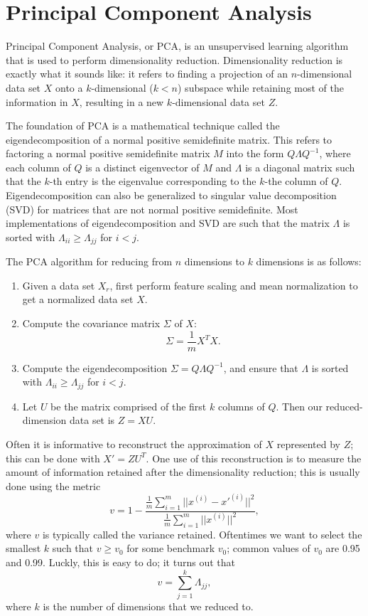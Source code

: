 \documentclass{article}
\begin{document}
\section{Principal Component Analysis}
Principal Component Analysis, or PCA, is an unsupervised learning algorithm that is used to perform dimensionality reduction. Dimensionality reduction is exactly what it sounds like: it refers to finding a projection of an $n$-dimensional data set $X$ onto a $k$-dimensional ($k < n$) subspace while retaining most of the information in $X$, resulting in a new $k$-dimensional data set $Z$.

The foundation of PCA is a mathematical technique called the eigendecomposition of a normal positive semidefinite matrix. This refers to factoring a normal positive semidefinite matrix $M$ into the form $Q\Lambda Q^{-1}$, where each column of $Q$ is a distinct eigenvector of $M$ and $\Lambda$ is a diagonal matrix such that the $k$-th entry is the eigenvalue corresponding to the $k$-the column of $Q$. Eigendecomposition can also be generalized to singular value decomposition (SVD) for matrices that are not normal positive semidefinite. Most implementations of eigendecomposition and SVD are such that the matrix $\Lambda$ is sorted with $\Lambda_{ii} \ge \Lambda_{jj}$ for $i < j$.

The PCA algorithm for reducing from $n$ dimensions to $k$ dimensions is as follows:
\begin{enumerate}
\item Given a data set $X_r$, first perform feature scaling and mean normalization to get a normalized data set $X$.
\item Compute the covariance matrix $\Sigma$ of $X$:
$$\Sigma = \frac{1}{m}X^TX.$$
\item Compute the eigendecomposition $\Sigma = Q\Lambda Q^{-1}$, and ensure that $\Lambda$ is sorted with $\Lambda_{ii} \ge \Lambda_{jj}$ for $i < j$.
\item Let $U$ be the matrix comprised of the first $k$ columns of $Q$. Then our reduced-dimension data set is $Z = XU$.
\end{enumerate}
Often it is informative to reconstruct the approximation of $X$ represented by $Z$; this can be done with $X' = ZU^T$. One use of this reconstruction is to measure the amount of information retained after the dimensionality reduction; this is usually done using the metric
$$v = 1 - \frac{\frac{1}{m} \sum_{i=1}^m ||x^{(i)} - x'^{(i)}||^2}{\frac{1}{m} \sum_{i=1}^m ||x^{(i)}||^2},$$
where $v$ is typically called the variance retained. Oftentimes we want to select the smallest $k$ such that $v \ge v_0$ for some benchmark $v_0$; common values of $v_0$ are 0.95 and 0.99. Luckly, this is easy to do; it turns out that
$$v = \sum_{j=1}^k \Lambda_{jj},$$
where $k$ is the number of dimensions that we reduced to.
\end{document}
